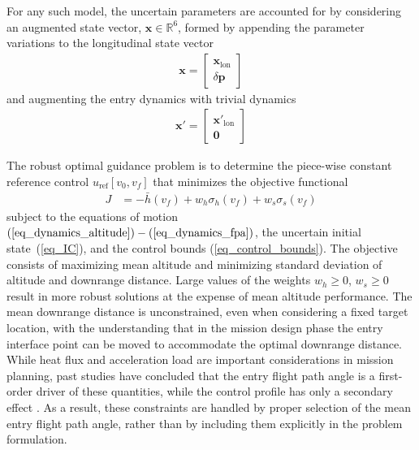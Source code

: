 \documentclass[journal ]{new-aiaa}
\newcommand{\state}{\ensuremath{\mathbf{x}}}
\newcommand{\ur}{\ensuremath{u_{\mathrm{ref}}}}
\newcommand{\param}{\ensuremath{\mathbf{p}}}
\newcommand{\E}[1]{\mathbb{E}\left[#1\right]}
\newcommand{\V}[1]{\mathbb{V}[#1]}
\begin{document}
For any such model, the uncertain parameters are accounted for by considering an augmented state vector, $\state\in \mathbb{R}^{6}$, formed by appending the parameter variations to the longitudinal state vector
\begin{align}
	\state = \left[
	\begin{matrix}
		\state_{\mathrm{lon}} \\
		\delta\param
	\end{matrix}
	\right]
\end{align} 
and augmenting the entry dynamics with trivial dynamics
\begin{align}
	\state' = \left[
	\begin{matrix}
		\state'_{\mathrm{lon}} \\
		\mathbf{0}
	\end{matrix}
	\right]
\end{align}

The robust optimal guidance problem is to determine the piece-wise constant reference control $\ur\left[v_0,v_f\right]$ that minimizes the objective functional
\begin{align}
J &= -\bar{h}(v_f) + w_h\sigma_h(v_f) + w_s\sigma_s(v_f) \label{eq_objective}
\end{align}
subject to the equations of motion $(\ref{eq_dynamics_altitude})-(\ref{eq_dynamics_fpa})$, the uncertain initial state~(\ref{eq_IC}), and the control bounds (\ref{eq_control_bounds}). 
The objective consists of maximizing mean altitude and minimizing standard deviation of altitude and downrange distance. Large values of the weights $w_h\ge0$, $w_s\ge0$ result in more robust solutions at the expense of mean altitude performance.
The mean downrange distance is unconstrained, even when considering a fixed target location, with the understanding that in the mission design phase the entry interface point can be moved to accommodate the optimal downrange distance. While heat flux and acceleration load are important considerations in mission planning, past studies have concluded that the entry flight path angle is a first-order driver of these quantities, while the control profile has only a secondary effect \cite{MSL_EDL2}. As a result, these constraints are handled by proper selection of the mean entry flight path angle, rather than by including them explicitly in the problem formulation. 
\end{document}

